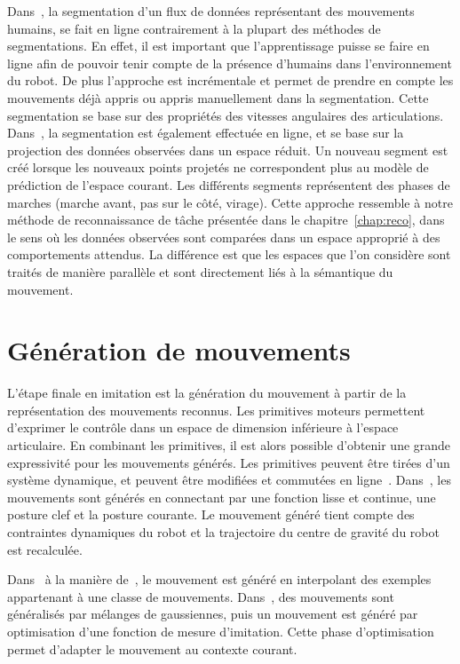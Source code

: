 Dans~\cite{kulic08a}, la segmentation d'un flux
de données représentant des mouvements humains, se fait en ligne contrairement à la plupart
des méthodes de segmentations. En effet, il est important que l'apprentissage puisse se faire en ligne
afin de pouvoir tenir compte de la présence d'humains dans l'environnement du robot.
De plus l'approche est incrémentale et permet de
prendre en compte les mouvements déjà appris ou appris manuellement dans 
la segmentation. Cette segmentation se base sur des propriétés des vitesses angulaires des articulations.
Dans~\cite{chalodhorn09}, la segmentation est également effectuée en ligne, 
et se base sur la projection des données observées
dans un espace réduit. Un nouveau segment est créé lorsque les nouveaux points projetés ne correspondent
plus au modèle de prédiction de l'espace courant. Les différents segments représentent
des phases de marches (marche avant, pas sur le côté, virage).
Cette approche ressemble à notre méthode de reconnaissance de t\^ache présentée
dans le chapitre~\ref{chap:reco}, dans le sens où 
les données observées sont comparées dans un espace approprié à des comportements attendus.
La différence est que les espaces que l'on considère sont traités de manière parallèle
et sont directement liés à la sémantique du mouvement.

\section{Génération de mouvements}
L'étape finale en imitation est la génération du mouvement à partir
de la représentation des mouvements reconnus. Les primitives moteurs
permettent d'exprimer le contrôle dans un espace de dimension
inférieure à l'espace articulaire. En combinant
les primitives, il est alors possible d'obtenir une 
grande expressivité pour les mouvements générés. Les primitives
peuvent être tirées d'un système dynamique, et peuvent être
modifiées et commutées en ligne~\cite{degallier08}.
Dans~\cite{sugihara05}, les mouvements sont générés en connectant
par une fonction lisse et continue, une posture clef et la posture courante.
Le mouvement généré tient compte des contraintes dynamiques du robot
et la trajectoire du centre de gravité du robot est recalculée.

Dans~\cite{drumwright03} à la manière de~\cite{rose98},
le mouvement est généré en interpolant des exemples appartenant à une classe de mouvements.
Dans~\cite{calinon07a}, des mouvements sont généralisés par 
mélanges de gaussiennes, puis un mouvement est généré par optimisation
d'une fonction de mesure d'imitation. Cette phase d'optimisation
permet d'adapter le mouvement au contexte courant.

